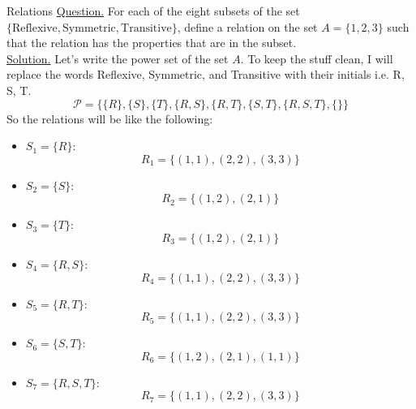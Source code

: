 \begin{example}{Relations}
	\underline{Question.} For each of the eight subsets of the set $ \{ \text{Reflexive}, \text{Symmetric}, \text{Transitive} \} $, define a relation on the set $ A = \{ 1,2,3\} $ such that the relation has the properties that are in the subset. \\
	
	\underline{Solution.} Let's write the power set of the set $ A $. To keep the stuff clean, I will replace the words Reflexive, Symmetric, and Transitive with their initials i.e. R, S, T.
	\[ \mathcal{P} = \{ \{ R \}, \{ S \}, \{ T \}, \{ R,S \}, \{ R,T \}, \{ S,T \}, \{ R,S,T \}, \{  \} \} \]
	So the relations will be like the following:
	\begin{itemize}
		\item $ S_1 = \{ R \} $: \[ R_1 = \{ (1,1), (2,2), (3,3) \} \]
		\item $ S_2 = \{ S \} $: \[ R_2 = \{ (1,2), (2,1) \} \]
		\item $ S_3 = \{ T \} $: \[ R_3 = \{ (1,2), (2,1) \} \]
		\item $ S_4 = \{ R,S \} $: \[ R_4 = \{ (1,1), (2,2), (3,3) \} \]
		\item $ S_5 = \{ R,T \} $: \[ R_5 = \{ (1,1), (2,2), (3,3) \} \]
		\item $ S_6 = \{ S,T \} $: \[ R_6 = \{ (1,2), (2,1), (1,1) \} \]
		\item $ S_7 = \{ R,S,T \} $: \[ R_7 = \{ (1,1), (2,2), (3,3) \} \]
	\end{itemize}
\end{example}

